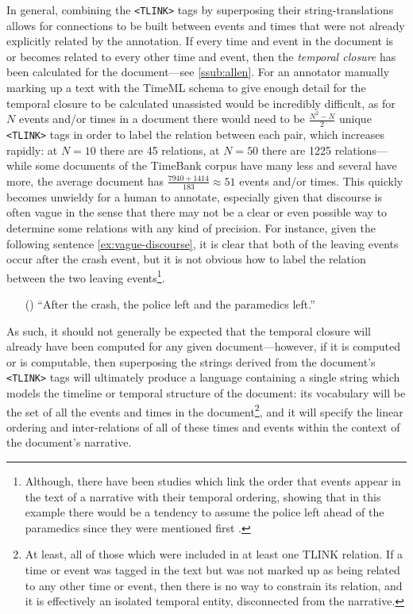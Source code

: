\documentclass[a4paper,12pt,leqno]{article}
\newcommand{\ipp}{(\refstepcounter{equation}\theequation)}
\begin{document}
In general, combining the \verb|<TLINK>| tags by superposing their string-translations allows for connections to be built between events and times that were not already explicitly related by the annotation. If every time and event in the document is or becomes related to every other time and event, then the \textit{temporal closure} has been calculated for the document---see \cref{ssub:allen}. For an annotator manually marking up a text with the TimeML schema to give enough detail for the temporal closure to be calculated unassisted would be incredibly difficult, as for $N$ events and/or times in a document there would need to be $\frac{N^2 - N}{2}$ unique \verb|<TLINK>| tags in order to label the relation between each pair, which increases rapidly: at $N = 10$ there are 45 relations, at $N = 50$ there are 1225 relations---while some documents of the TimeBank corpus have many less and several have more, the average document has $\frac{7940+1414}{183} \approx 51$ events and/or times. This quickly becomes unwieldy for a human to annotate, especially given that discourse is often vague in the sense that there may not be a clear or even possible way to determine some relations with any kind of precision. For instance, given the following sentence \cref{ex:vague-discourse}, it is clear that both of the leaving events occur after the crash event, but it is not obvious how to label the relation between the two leaving events\footnote{Although, there have been studies which link the order that events appear in the text of a narrative with their temporal ordering, showing that in this example there would be a tendency to assume the police left ahead of the paramedics since they were mentioned first \citep{ohtsuka1992discourse}.}.
\begin{itemize}
	\item[\ipp\label{ex:vague-discourse}] ``After the crash, the police left and the paramedics left.''
\end{itemize}
As such, it should not generally be expected that the temporal closure will already have been computed for any given document---however, if it is computed or is computable, then superposing the strings derived from the document's \verb|<TLINK>| tags will ultimately produce a language containing a single string which models the timeline or temporal structure of the document: its vocabulary will be the set of all the events and times in the document\footnote{At least, all of those which were included in at least one TLINK relation. If a time or event was tagged in the text but was not marked up as being related to any other time or event, then there is no way to constrain its relation, and it is effectively an isolated temporal entity, disconnected from the narrative.}, and it will specify the linear ordering and inter-relations of all of these times and events within the context of the document's narrative.
\end{document}
